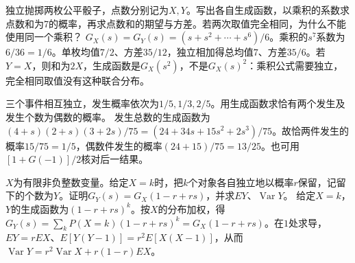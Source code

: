 独立抛掷两枚公平骰子，点数分别记为\(X,Y\)。写出各自生成函数，以乘积的系数求点数和为7的概率，再求点数和的期望与方差。若两次取值完全相同，为什么不能使用同一个乘积？
\solutionanswer
\(G_X(s)=G_Y(s)=(s+s^2+\cdots+s^6)/6\)。乘积的\(s^7\)系数为\(6/36=1/6\)。单枚均值\(7/2\)、方差\(35/12\)，独立相加得总均值\(7\)、方差\(35/6\)。若\(Y=X\)，则和为\(2X\)，生成函数是\(G_X(s^2)\)，不是\(G_X(s)^2\)：乘积公式需要独立，完全相同取值没有这种联合分布。


三个事件相互独立，发生概率依次为\(1/5,1/3,2/5\)。用生成函数求恰有两个发生及发生个数为偶数的概率。
\solutionanswer
发生总数的生成函数为\((4+s)(2+s)(3+2s)/75=(24+34s+15s^2+2s^3)/75\)。故恰两件发生的概率\(15/75=1/5\)，偶数件发生的概率\((24+15)/75=13/25\)。也可用\([1+G(-1)]/2\)核对后一结果。


\(X\)为有限非负整数变量。给定\(X=k\)时，把\(k\)个对象各自独立地以概率\(r\)保留，记留下的个数为\(Y\)。证明\(G_Y(s)=G_X(1-r+rs)\)，并求\(EY\)、\(\operatorname{Var}Y\)。
\solutionanswer
给定\(X=k\)，\(Y\)的生成函数为\((1-r+rs)^k\)。按\(X\)的分布加权，得\(G_Y(s)=\sum_kP(X=k)(1-r+rs)^k=G_X(1-r+rs)\)。在\(1\)处求导，\(EY=rEX\)、\(E[Y(Y-1)]=r^2E[X(X-1)]\)，从而\(\operatorname{Var}Y=r^2\operatorname{Var}X+r(1-r)EX\)。
\par

